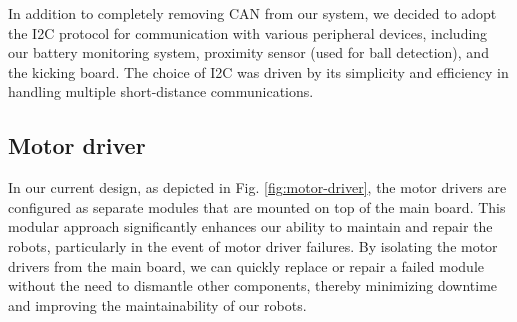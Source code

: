 \documentclass[runningheads]{llncs}
\begin{document}
In addition to completely removing CAN from our system, we decided to adopt the I2C protocol for communication with various peripheral devices, including our battery monitoring system, proximity sensor (used for ball detection), and the kicking board. The choice of I2C was driven by its simplicity and efficiency in handling multiple short-distance communications.

\subsection{Motor driver}
In our current design, as depicted in Fig. \ref{fig:motor-driver}, the motor drivers are configured as separate modules \cite{ref_motordriver} that are mounted on top of the main board. This modular approach significantly enhances our ability to maintain and repair the robots, particularly in the event of motor driver failures. By isolating the motor drivers from the main board, we can quickly replace or repair a failed module without the need to dismantle other components, thereby minimizing downtime and improving the maintainability of our robots.
\end{document}
